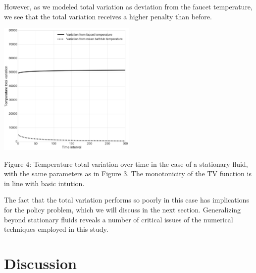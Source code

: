\documentclass[12pt]{article}
\begin{document}
However, as we modeled total variation as deviation from the faucet temperature,
we see that the total variation receives a higher penalty than before.


\begin{center}
    \includegraphics[width=0.5\textwidth]{../plots/tv-02.png}

    Figure 4: Temperature total variation over time in the case of a stationary
    fluid, with the same parameters as in Figure 3. The monotonicity of the TV
    function is in line with basic intution.
\end{center}

The fact that the total variation performs so poorly in this case has
implications for the policy problem, which we will discuss in the next section.
Generalizing beyond stationary fluids reveals a number of critical issues of the
numerical techniques employed in this study.


\section{Discussion}

\nocite{*}

\printbibliography
\end{document}
